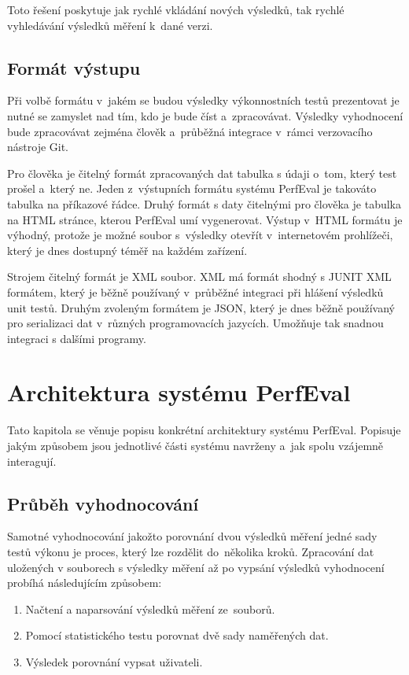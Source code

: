 Toto řešení poskytuje jak rychlé vkládání nových výsledků, tak rychlé vyhledávání výsledků měření k~dané verzi.

\subsection{Formát výstupu}

Při volbě formátu v~jakém se budou výsledky výkonnostních testů prezentovat je nutné se zamyslet nad tím, kdo je bude číst a~zpracovávat.
Výsledky vyhodnocení bude zpracovávat zejména člověk a~průběžná integrace v~rámci verzovacího nástroje Git.

Pro člověka je čitelný formát zpracovaných dat tabulka s údaji o~tom, který test prošel a~který ne.
Jeden z~výstupních formátu systému PerfEval je takováto tabulka na příkazové řádce. Druhý formát s daty čitelnými pro člověka je
tabulka na HTML stránce, kterou PerfEval umí vygenerovat. Výstup v~HTML formátu je výhodný, protože je možné
soubor s~výsledky otevřít v~internetovém prohlížeči, který je dnes dostupný téměř na každém zařízení.

Strojem čitelný formát je XML soubor. XML má formát shodný s JUNIT XML formátem, který je běžně používaný v~průběžné integraci
při hlášení výsledků unit testů. Druhým zvoleným formátem je JSON, který je dnes běžně používaný pro serializaci dat v~různých
programovacích jazycích. Umožňuje tak snadnou integraci s dalšími programy.

\section{Architektura systému PerfEval}

Tato kapitola se věnuje popisu konkrétní architektury systému PerfEval.
Popisuje jakým způsobem jsou jednotlivé části systému navrženy a~jak spolu vzájemně interagují.

\subsection{Průběh vyhodnocování}

Samotné vyhodnocování jakožto porovnání dvou výsledků měření jedné sady testů výkonu je proces, který lze rozdělit do~několika kroků.
Zpracování dat uložených v souborech s výsledky měření až po vypsání výsledků vyhodnocení probíhá následujícím způsobem:

\begin{enumerate}
    \item Načtení a naparsování výsledků měření ze~souborů.
    \item Pomocí statistického testu porovnat dvě sady naměřených dat.
    \item Výsledek porovnání vypsat uživateli.
\end{enumerate}

